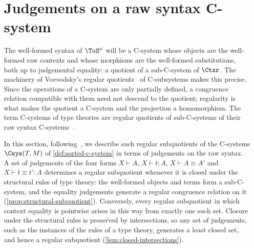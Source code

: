 \section{Judgements on a raw syntax C-system}
\label{sec:raw-judgements}

The well-formed syntax of $\ToS^\omega$ will be a C-system whose objects are the well-formed raw contexts and whose morphisms are the well-formed substitutions, both up to judgemental equality: a quotient of a sub-C-system of $\Ctxr$. The machinery of Voevodsky's regular quotients~\cite{Voevodsky2014Subsystems} of C-subsystems makes this precise. Since the operations of a C-system are only partially defined, a congruence relation compatible with them need not descend to the quotient; regularity is what makes the quotient a C-system and the projection a homomorphism. The term C-systems of type theories are regular quotients of sub-C-systems of their raw syntax C-systems~\cite[\S1]{Voevodsky2016Relative}.

In this section, following~\cite{Voevodsky2014Module}, we describe such regular subquotients of the C-systems $\Csys(T, M)$ of \cref{def:sorted-c-system} in terms of judgements on the raw syntax. A set of judgements of the four forms $X \vdash A$, $X \vdash t : A$, $X \vdash A \equiv A'$ and $X \vdash t \equiv t' : A$ determines a regular subquotient whenever it is closed under the structural rules of type theory: the well-formed objects and terms form a sub-C-system, and the equality judgements generate a regular congruence relation on it (\cref{prop:structural-subquotient}). Conversely, every regular subquotient in which context equality is pointwise arises in this way from exactly one such set. Closure under the structural rules is preserved by intersections, so any set of judgements, such as the instances of the rules of a type theory, generates a least closed set, and hence a regular subquotient (\cref{lem:closed-intersections}).

